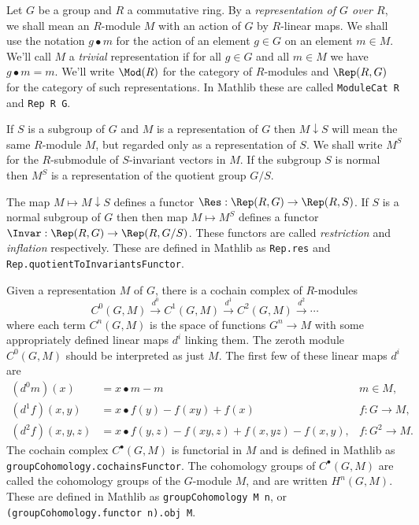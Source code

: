 Let $G$ be a group and $R$ a commutative ring.
By a \emph{representation of $G$ over $R$},
we shall mean an $R$-module $M$ with an action of $G$ by $R$-linear maps.
We shall use the notation $g \bullet m$ for the action of an element $g \in G$
on an element $m \in M$.
We'll call $M$ a \emph{trivial} representation if for all $g \in G$ and all $m \in M$ we
have $g \bullet m = m$.
We'll write $\Mod(R)$ for the category of $R$-modules and $\Rep(R,G)$
for the category of such representations.
In Mathlib these are called \texttt{ModuleCat R} and \texttt{Rep R G}.

If $S$ is a subgroup of $G$ and $M$ is a representation of $G$
then $M \downarrow S$ will mean the same $R$-module $M$,
but regarded only as a representation of $S$.
We shall write $M^S$ for the $R$-submodule of $S$-invariant vectors in $M$.
If the subgroup $S$ is normal then $M^S$ is a representation of the quotient group $G/S$.

\begin{definition} \label{def:inflation restriction functors}
	\leanok
	\mathlibok
	The map $M \mapsto M \downarrow S$ defines a functor $\Res : \Rep(R,G) \to \Rep(R,S)$.
	If $S$ is a normal subgroup of $G$ then then map $M \mapsto M^S$ defines
	a functor $\Invar : \Rep(R,G) \to \Rep(R, G/S)$.
	These functors are called \emph{restriction} and \emph{inflation} respectively.
	These are defined in Mathlib as \texttt{Rep.res} and \texttt{Rep.quotientToInvariantsFunctor}.
\end{definition}


Given a representation $M$ of $G$, there is a cochain complex of $R$-modules
\[
	C^0(G,M) \stackrel{d^0}\to C^1(G,M)  \stackrel{d^1}\to C^2(G,M)  \stackrel{d^2}\to \cdots
\]
where each term $C^n(G,M)$ is the space of functions $G^n \to M$ with some appropriately defined
linear maps $d^i$ linking them.
The zeroth module $C^0(G,M)$ should be interpreted as just $M$.
The first few of these linear maps $d^i$ are
\begin{align*}
	(d^0 m)(x) &= x \bullet m - m
	& m \in M, \\
	(d^1 f)(x,y) &= x \bullet f(y) - f(xy) + f(x)
	& f : G \to M,\\
	(d^2 f)(x,y,z) &= x\bullet f(y,z) - f(xy,z) + f(x,yz) - f(x,y),
	& f : G^2 \to M.
\end{align*}
The cochain complex $C^\bullet(G,M)$ is functorial in $M$ and is defined in Mathlib as
\texttt{groupCohomology.cochainsFunctor}.
The cohomology groups of $C^\bullet(G,M)$ are called the cohomology groups of the
$G$-module $M$, and are written $H^n(G,M)$. These are defined in Mathlib as
\texttt{groupCohomology M n}, or \texttt{(groupCohomology.functor n).obj M}.

